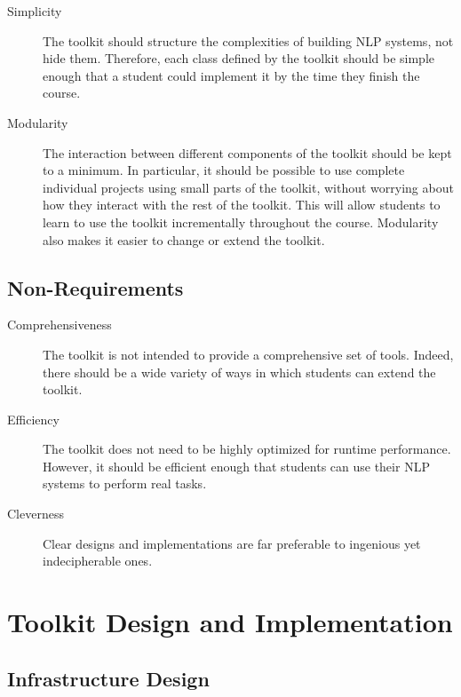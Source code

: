 \documentclass{article}
\begin{document}
\begin{description}
\item[Simplicity] The toolkit should structure the complexities of
building NLP systems, not hide them.  Therefore, each class defined by 
the toolkit should be simple enough that a student could implement it
by the time they finish the course.

\item[Modularity] The interaction between different components of the
toolkit should be kept to a minimum.  In particular, it should be
possible to use complete individual projects using small parts of the
toolkit, without worrying about how they interact with the rest of the
toolkit.  This will allow students to learn to use the toolkit
incrementally throughout the course.  Modularity also makes it easier
to change or extend the toolkit.
\end{description}

\subsection{Non-Requirements}

\begin{description}
\item[Comprehensiveness] The toolkit is not intended to provide a
comprehensive set of tools.  Indeed, there should be a wide variety of 
ways in which students can extend the toolkit.

\item[Efficiency] The toolkit does not need to be highly optimized for
runtime performance.  However, it should be efficient enough that
students can use their NLP systems to perform real tasks.

\item[Cleverness] Clear designs and implementations are far preferable 
to ingenious yet indecipherable ones.
\end{description}

\section{Toolkit Design and Implementation}

\subsection{Infrastructure Design}
\end{document}
